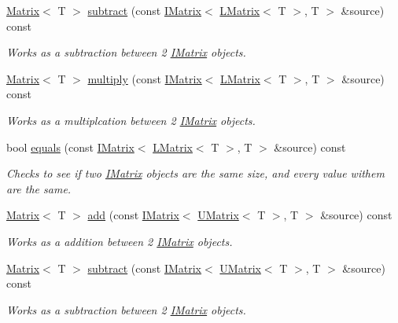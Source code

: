 \begin{DoxyCompactItemize}
\mbox{\hyperlink{class_matrix}{Matrix}}$<$ T $>$ \mbox{\hyperlink{class_matrix_a26f30ae5b84d1b7186826d3a7d878c7c}{subtract}} (const \mbox{\hyperlink{class_i_matrix}{I\+Matrix}}$<$ \mbox{\hyperlink{class_l_matrix}{L\+Matrix}}$<$ T $>$, T $>$ \&source) const
\begin{DoxyCompactList}\small\item\em Works as a subtraction between 2 \mbox{\hyperlink{class_i_matrix}{I\+Matrix}} objects. \end{DoxyCompactList}\item 
\mbox{\hyperlink{class_matrix}{Matrix}}$<$ T $>$ \mbox{\hyperlink{class_matrix_a1e2f2e670f13fb5cf119c1a9ab853f41}{multiply}} (const \mbox{\hyperlink{class_i_matrix}{I\+Matrix}}$<$ \mbox{\hyperlink{class_l_matrix}{L\+Matrix}}$<$ T $>$, T $>$ \&source) const
\begin{DoxyCompactList}\small\item\em Works as a multiplcation between 2 \mbox{\hyperlink{class_i_matrix}{I\+Matrix}} objects. \end{DoxyCompactList}\item 
bool \mbox{\hyperlink{class_matrix_ab5c137907e248616966ab336b2974587}{equals}} (const \mbox{\hyperlink{class_i_matrix}{I\+Matrix}}$<$ \mbox{\hyperlink{class_l_matrix}{L\+Matrix}}$<$ T $>$, T $>$ \&source) const
\begin{DoxyCompactList}\small\item\em Checks to see if two \mbox{\hyperlink{class_i_matrix}{I\+Matrix}} objects are the same size, and every value withem are the same. \end{DoxyCompactList}\item 
\mbox{\hyperlink{class_matrix}{Matrix}}$<$ T $>$ \mbox{\hyperlink{class_matrix_adcc8d1f307ef187dcec103cf3273ae6a}{add}} (const \mbox{\hyperlink{class_i_matrix}{I\+Matrix}}$<$ \mbox{\hyperlink{class_u_matrix}{U\+Matrix}}$<$ T $>$, T $>$ \&source) const
\begin{DoxyCompactList}\small\item\em Works as a addition between 2 \mbox{\hyperlink{class_i_matrix}{I\+Matrix}} objects. \end{DoxyCompactList}\item 
\mbox{\hyperlink{class_matrix}{Matrix}}$<$ T $>$ \mbox{\hyperlink{class_matrix_a2d19a259945e67f5eb61c0981d323da5}{subtract}} (const \mbox{\hyperlink{class_i_matrix}{I\+Matrix}}$<$ \mbox{\hyperlink{class_u_matrix}{U\+Matrix}}$<$ T $>$, T $>$ \&source) const
\begin{DoxyCompactList}\small\item\em Works as a subtraction between 2 \mbox{\hyperlink{class_i_matrix}{I\+Matrix}} objects. \end{DoxyCompactList}\item 

\end{DoxyCompactItemize}
